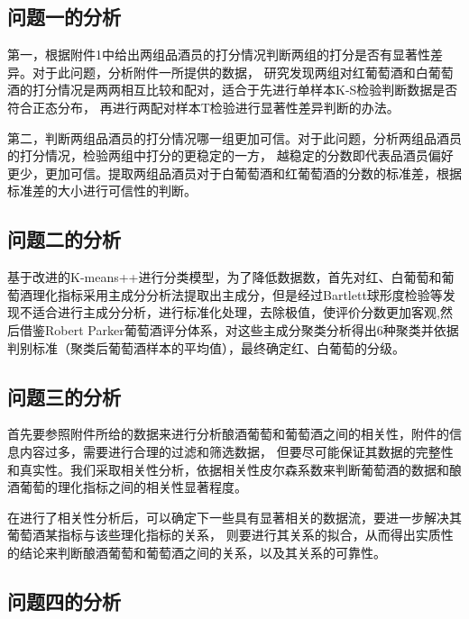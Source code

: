 \documentclass[UTF8]{ctexart}
\begin{document}
\subsection{问题一的分析}
第一，根据附件1中给出两组品酒员的打分情况判断两组的打分是否有显著性差异。对于此问题，分析附件一所提供的数据，
研究发现两组对红葡萄酒和白葡萄酒的打分情况是两两相互比较和配对，适合于先进行单样本K-S检验判断数据是否符合正态分布，
再进行两配对样本T检验进行显著性差异判断的办法。

第二，判断两组品酒员的打分情况哪一组更加可信。对于此问题，分析两组品酒员的打分情况，检验两组中打分的更稳定的一方，
越稳定的分数即代表品酒员偏好更少，更加可信。提取两组品酒员对于白葡萄酒和红葡萄酒的分数的标准差，根据标准差的大小进行可信性的判断。

\subsection{问题二的分析}
基于改进的K-means++\cite{arthur2006k}进行分类模型，为了降低数据数，首先对红、白葡萄和葡萄酒理化指标采用主成分分析法提取出主成分，但是经过Bartlett球形度检验\cite{arsham2011bartlett}等发现不适合进行主成分分析，进行标准化处理，去除极值，使评价分数更加客观,然后借鉴Robert Parker葡萄酒评分体系\cite{hommerberg2011persuasiveness}，对这些主成分聚类分析得出6种聚类并依据判别标准（聚类后葡萄酒样本的平均值），最终确定红、白葡萄的分级。

\subsection{问题三的分析}
首先要参照附件所给的数据来进行分析酿酒葡萄和葡萄酒之间的相关性，附件的信息内容过多，需要进行合理的过滤和筛选数据，
但要尽可能保证其数据的完整性和真实性。我们采取相关性分析，依据相关性皮尔森系数来判断葡萄酒的数据和酿酒葡萄的理化指标之间的相关性显著程度。

在进行了相关性分析后，可以确定下一些具有显著相关的数据流，要进一步解决其葡萄酒某指标与该些理化指标的关系，
则要进行其关系的拟合，从而得出实质性的结论来判断酿酒葡萄和葡萄酒之间的关系，以及其关系的可靠性。
\subsection{问题四的分析}
\end{document}
